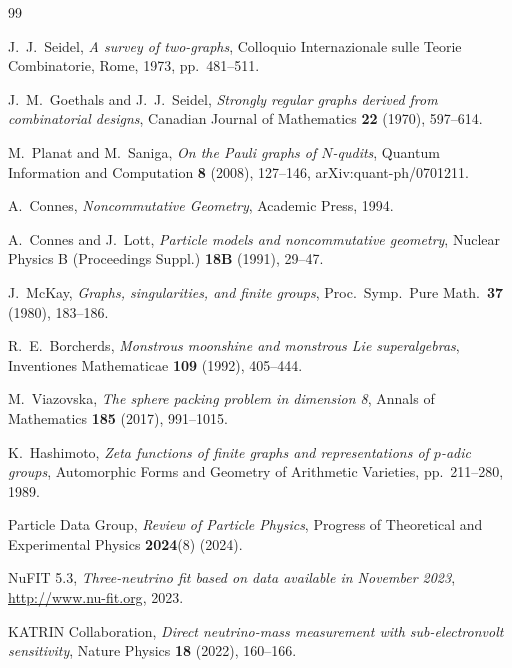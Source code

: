 \documentclass[12pt,a4paper]{article}
\begin{document}

\begin{thebibliography}{99}

J.~J.~Seidel,
\textit{A survey of two-graphs},
Colloquio Internazionale sulle Teorie Combinatorie, Rome, 1973,
pp.~481--511.

J.~M.~Goethals and J.~J.~Seidel,
\textit{Strongly regular graphs derived from combinatorial designs},
Canadian Journal of Mathematics \textbf{22} (1970), 597--614.

M.~Planat and M.~Saniga,
\textit{On the Pauli graphs of $N$-qudits},
Quantum Information and Computation \textbf{8} (2008), 127--146,
arXiv:quant-ph/0701211.

A.~Connes,
\textit{Noncommutative Geometry},
Academic Press, 1994.

A.~Connes and J.~Lott,
\textit{Particle models and noncommutative geometry},
Nuclear Physics B (Proceedings Suppl.) \textbf{18B} (1991), 29--47.

J.~McKay,
\textit{Graphs, singularities, and finite groups},
Proc.~Symp.~Pure Math.~\textbf{37} (1980), 183--186.

R.~E.~Borcherds,
\textit{Monstrous moonshine and monstrous Lie superalgebras},
Inventiones Mathematicae \textbf{109} (1992), 405--444.

M.~Viazovska,
\textit{The sphere packing problem in dimension 8},
Annals of Mathematics \textbf{185} (2017), 991--1015.

K.~Hashimoto,
\textit{Zeta functions of finite graphs and representations of
$p$-adic groups},
Automorphic Forms and Geometry of Arithmetic Varieties,
pp.~211--280, 1989.

Particle Data Group,
\textit{Review of Particle Physics},
Progress of Theoretical and Experimental Physics \textbf{2024}(8)
(2024).

NuFIT 5.3,
\textit{Three-neutrino fit based on data available in November 2023},
\url{http://www.nu-fit.org}, 2023.

KATRIN Collaboration,
\textit{Direct neutrino-mass measurement with sub-electronvolt
sensitivity},
Nature Physics \textbf{18} (2022), 160--166.


\end{thebibliography}
\end{document}
